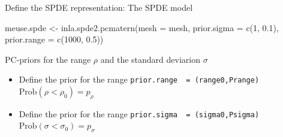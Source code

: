 \documentclass[
  ignorenonframetext,
]{beamer}
\newenvironment{Shaded}{\begin{snugshade}}{\end{snugshade}}
\newcommand{\AttributeTok}[1]{\textcolor[rgb]{0.77,0.63,0.00}{#1}}
\newcommand{\DecValTok}[1]{\textcolor[rgb]{0.00,0.00,0.81}{#1}}
\newcommand{\FloatTok}[1]{\textcolor[rgb]{0.00,0.00,0.81}{#1}}
\newcommand{\FunctionTok}[1]{\textcolor[rgb]{0.00,0.00,0.00}{#1}}
\newcommand{\NormalTok}[1]{#1}
\newcommand{\OtherTok}[1]{\textcolor[rgb]{0.56,0.35,0.01}{#1}}
\begin{document}
\begin{frame}[fragile]{Define the SPDE representation: The SPDE model}
\protect\hypertarget{define-the-spde-representation-the-spde-model}{}
\small

\begin{Shaded}
\begin{Highlighting}[]
\NormalTok{meuse.spde }\OtherTok{\textless{}{-}} \FunctionTok{inla.spde2.pcmatern}\NormalTok{(}\AttributeTok{mesh =}\NormalTok{ mesh,}
                                  \AttributeTok{prior.sigma =} \FunctionTok{c}\NormalTok{(}\DecValTok{1}\NormalTok{, }\FloatTok{0.1}\NormalTok{),}
                                  \AttributeTok{prior.range =} \FunctionTok{c}\NormalTok{(}\DecValTok{1000}\NormalTok{, }\FloatTok{0.5}\NormalTok{))}
\end{Highlighting}
\end{Shaded}

\normalsize

PC-priors for the range \(\rho\) and the standard deviarion \(\sigma\)

\begin{itemize}
\item
  Define the prior for the range
  \texttt{prior.range\ \ =\ (range0,Prange)}
  \(\text{Prob}(\rho<\rho_0) = p_{\rho}\)
\item
  Define the prior for the range
  \texttt{prior.sigma\ \ =\ (sigma0,Psigma)}
  \(\text{Prob}(\sigma<\sigma_0) = p_{\sigma}\)
\end{itemize}
\end{frame}
\end{document}
